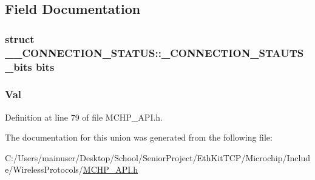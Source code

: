 \subsection{Field Documentation}
\hypertarget{union_____c_o_n_n_e_c_t_i_o_n___s_t_a_t_u_s_aa6caf5f68737fab9c1537e79ef885284}{}
\subsubsection[{bits}]{\setlength{\rightskip}{0pt plus 5cm}struct {\bf \+\_\+\+\_\+\+C\+O\+N\+N\+E\+C\+T\+I\+O\+N\+\_\+\+S\+T\+A\+T\+U\+S\+::\+\_\+\+C\+O\+N\+N\+E\+C\+T\+I\+O\+N\+\_\+\+S\+T\+A\+U\+T\+S\+\_\+bits}  bits}\label{union_____c_o_n_n_e_c_t_i_o_n___s_t_a_t_u_s_aa6caf5f68737fab9c1537e79ef885284}
\hypertarget{union_____c_o_n_n_e_c_t_i_o_n___s_t_a_t_u_s_a5ab8c2bf45b20b5f7aa3a4f083896cec}{}
\subsubsection[{Val}]{ Val}\label{union_____c_o_n_n_e_c_t_i_o_n___s_t_a_t_u_s_a5ab8c2bf45b20b5f7aa3a4f083896cec}


Definition at line 79 of file M\+C\+H\+P\+\_\+\+A\+P\+I.\+h.



The documentation for this union was generated from the following file\+:\begin{DoxyCompactItemize}
\item 
C\+:/\+Users/mainuser/\+Desktop/\+School/\+Senior\+Project/\+Eth\+Kit\+T\+C\+P/\+Microchip/\+Include/\+Wireless\+Protocols/\hyperlink{_m_c_h_p___a_p_i_8h}{M\+C\+H\+P\+\_\+\+A\+P\+I.\+h}\end{DoxyCompactItemize}
